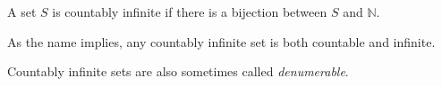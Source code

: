 \documentclass{article}
\begin{document}
A set $S$ is countably infinite if there is a bijection between $S$ and $\mathbb{N}$.

As the name implies, any countably infinite set is both countable and infinite.

Countably infinite sets are also sometimes called \emph{denumerable}.
\end{document}
